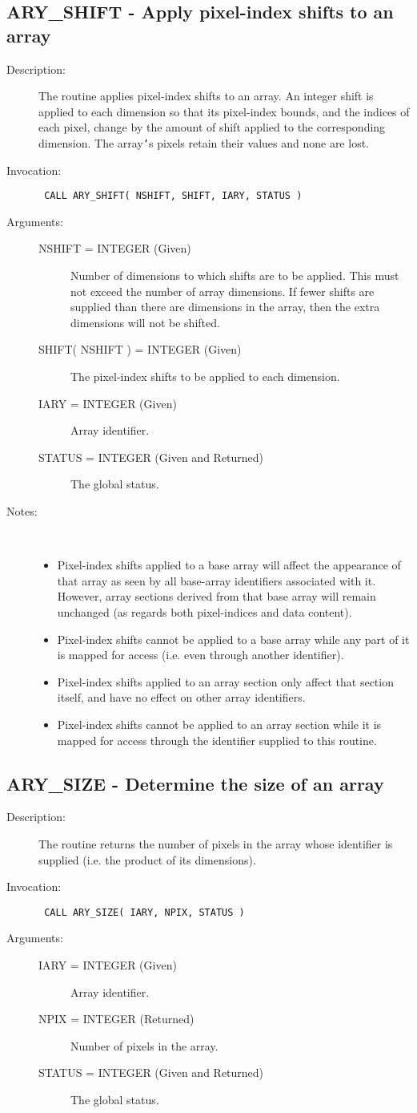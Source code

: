 \documentclass[twoside,11pt]{article}
\newcommand{\xlabel}[1]{}
\newlength{\sstbannerlength}
\newlength{\sstcaptionlength}
\newlength{\sstexampleslength}
\newlength{\sstexampleswidth}
\newcommand{\sstroutine}[3]{
   \goodbreak
   \rule{\textwidth}{0.5mm}
   \vspace{-7ex}
   \newline
   \settowidth{\sstbannerlength}{{\Large {\bf #1}}}
   \setlength{\sstcaptionlength}{\textwidth}
   \setlength{\sstexampleslength}{\textwidth}
   \addtolength{\sstbannerlength}{0.5em}
   \addtolength{\sstcaptionlength}{-2.0\sstbannerlength}
   \addtolength{\sstcaptionlength}{-5.0pt}
   \settowidth{\sstexampleswidth}{{\bf Examples:}}
   \addtolength{\sstexampleslength}{-\sstexampleswidth}
   \parbox[t]{\sstbannerlength}{\flushleft{\Large {\bf #1}}}
   \parbox[t]{\sstcaptionlength}{\center{\Large #2}}
   \parbox[t]{\sstbannerlength}{\flushright{\Large {\bf #1}}}
   \begin{description}
      #3
   \end{description}
}
\newcommand{\sstdescription}[1]{\item[Description:] #1}
\newcommand{\sstinvocation}[1]{\item[Invocation:]\hspace{0.4em}{\tt #1}}
\newcommand{\sstarguments}[1]{
   \item[Arguments:] \mbox{} \\
   \vspace{-3.5ex}
   \begin{description}
      #1
   \end{description}
}
\newcommand{\sstsubsection}[1]{ \item[{#1}] \mbox{} \\}
\newcommand{\sstnotes}[1]{\item[Notes:] \mbox{} \\[1.3ex] #1}
\newcommand{\sstitemlist}[1]{
  \mbox{} \\
  \vspace{-3.5ex}
  \begin{itemize}
     #1
  \end{itemize}
}
\newcommand{\sstitem}{\item}
\newcommand{\ssttt}{\tt}
\renewcommand{\sstroutine}[3]{
      \subsection{#1\xlabel{#1}-\label{#1}#2}
      \begin{description}
         #3
      \end{description}
   }
\renewcommand{\sstdescription}[1]{\item[Description:]
      \begin{description}
         #1
      \end{description}
   }
\renewcommand{\sstinvocation}[1]{\item[Invocation:]
      \begin{description}
         {\ssttt #1}
      \end{description}
   }
\renewcommand{\sstarguments}[1]{
      \item[Arguments:]
      \begin{description}
         #1
      \end{description}
   }
\renewcommand{\sstsubsection}[1]{\item[{#1}]}
\renewcommand{\sstnotes}[1]{\item[Notes:]
      \begin{description}
         #1
      \end{description}
   }
\newcommand{\sstitemlist}[1]{
      \begin{itemize}
         #1
      \end{itemize}
   }
\begin{document}
\sstroutine{
   ARY\_SHIFT
}{
   Apply pixel-index shifts to an array
}{
   \sstdescription{
      The routine applies pixel-index shifts to an array. An integer
      shift is applied to each dimension so that its pixel-index
      bounds, and the indices of each pixel, change by the amount of
      shift applied to the corresponding dimension. The array{\tt '}s pixels
      retain their values and none are lost.
   }
   \sstinvocation{
      CALL ARY\_SHIFT( NSHIFT, SHIFT, IARY, STATUS )
   }
   \sstarguments{
      \sstsubsection{
         NSHIFT = INTEGER (Given)
      }{
         Number of dimensions to which shifts are to be applied. This
         must not exceed the number of array dimensions. If fewer
         shifts are supplied than there are dimensions in the array,
         then the extra dimensions will not be shifted.
      }
      \sstsubsection{
         SHIFT( NSHIFT ) = INTEGER (Given)
      }{
         The pixel-index shifts to be applied to each dimension.
      }
      \sstsubsection{
         IARY = INTEGER (Given)
      }{
         Array identifier.
      }
      \sstsubsection{
         STATUS = INTEGER (Given and Returned)
      }{
         The global status.
      }
   }
   \sstnotes{
      \sstitemlist{

         \sstitem
         Pixel-index shifts applied to a base array will affect the
         appearance of that array as seen by all base-array identifiers
         associated with it. However, array sections derived from that
         base array will remain unchanged (as regards both pixel-indices
         and data content).

         \sstitem
         Pixel-index shifts cannot be applied to a base array while any
         part of it is mapped for access (i.e. even through another
         identifier).

         \sstitem
         Pixel-index shifts applied to an array section only affect
         that section itself, and have no effect on other array
         identifiers.

         \sstitem
         Pixel-index shifts cannot be applied to an array section while
         it is mapped for access through the identifier supplied to this
         routine.
      }
   }
}
\sstroutine{
   ARY\_SIZE
}{
   Determine the size of an array
}{
   \sstdescription{
      The routine returns the number of pixels in the array whose
      identifier is supplied (i.e. the product of its dimensions).
   }
   \sstinvocation{
      CALL ARY\_SIZE( IARY, NPIX, STATUS )
   }
   \sstarguments{
      \sstsubsection{
         IARY = INTEGER (Given)
      }{
         Array identifier.
      }
      \sstsubsection{
         NPIX = INTEGER (Returned)
      }{
         Number of pixels in the array.
      }
      \sstsubsection{
         STATUS = INTEGER (Given and Returned)
      }{
         The global status.
      }
   }
}
\end{document}
